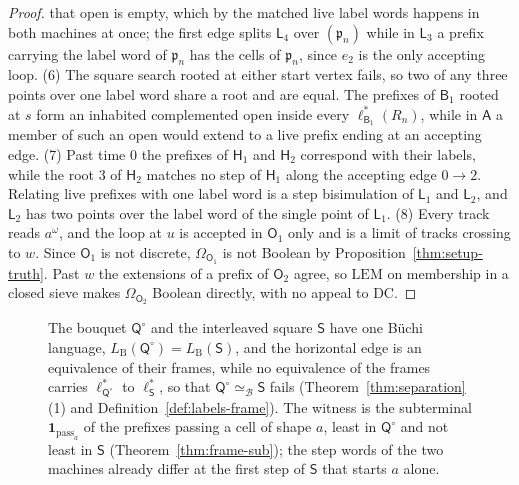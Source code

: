 \documentclass{lmcs}
\theoremstyle{definition}
\theoremstyle{remark}
\newcommand{\Op}{\mathcal{O}}
\newcommand{\prin}[1]{\mathrm{#1}}
\newcommand{\EM}{\prin{LEM}}
\newcommand{\sbt}[1]{\mathbf{1}_{#1}}
\newcommand{\LW}{\mathrm{LW}}
\providecommand{\LB}[1]{L_{\mathrm{B}}(#1)}
\providecommand{\KA}{\mathsf{A}}
\providecommand{\KB}[1]{\mathsf{B}_{#1}}
\providecommand{\wQ}{\mathsf{Q}}
\providecommand{\eqB}{\simeq_{\mathcal{B}}}
\providecommand{\lst}[1]{\ell^{*}_{#1}}
\providecommand{\DC}{\prin{DC}}
\providecommand{\wQ}{\mathsf{Q}}
\begin{document}
\begin{proof}
that open is empty, which by the matched live label words happens in both machines at once;
the first edge splits $\mathsf L_4$ over $(\mathfrak p_n)$ while in
$\mathsf L_3$ a prefix carrying the label word of $\mathfrak p_n$ has the cells of $\mathfrak p_n$, since $e_2$ is the only accepting
loop.
(6) The square search rooted at either start vertex fails, so two of any three points over one label word share a
root and are equal.
The prefixes of $\KB{1}$ rooted at $s$ form an inhabited complemented open inside every $\lst{\KB{1}}(R_n)$, while
in $\KA$ a member of such an open would extend to a live prefix ending at an accepting
edge.
(7) Past time $0$ the prefixes of $\mathsf H_1$ and $\mathsf H_2$ correspond with their
labels,
while the root $3$ of $\mathsf H_2$ matches no step of $\mathsf H_1$ along the accepting edge
$0\to2$. Relating live prefixes with one label word is a step bisimulation of
$\mathsf L_1$ and $\mathsf L_2$, and $\mathsf L_2$ has two points over the label word
of the single point of $\mathsf L_1$.
(8) Every track reads $a^\omega$, and the loop at $u$ is accepted in $\mathsf O_1$ only and is a limit of tracks
crossing to $w$.
Since $\mathsf O_1$ is not discrete, $\Omega_{\mathsf O_1}$ is not Boolean by
Proposition~\ref{thm:setup-truth}. Past $w$ the extensions of a prefix of $\mathsf O_2$ agree, so $\EM$ on membership in a closed sieve makes
$\Omega_{\mathsf O_2}$ Boolean directly, with no appeal to $\DC$.
\end{proof}

\begin{figure}[htb]
\centering
{}
\caption{The bouquet $\wQ^\circ$ and the interleaved square $\mathsf S$ have one B\"uchi language, $\LB{\wQ^\circ}=\LB{\mathsf S}$, and the horizontal edge is an
equivalence of their frames, while no equivalence of the frames carries $\lst{\wQ^\circ}$ to $\lst{\mathsf S}$, so that
$\wQ^\circ\eqB\mathsf S$ fails
(Theorem~\ref{thm:separation}(1) and Definition~\ref{def:labels-frame}). The witness is the subterminal $\sbt{\mathrm{pass}_a}$ of the prefixes passing a
cell of shape $a$, least in $\wQ^\circ$ and not least in $\mathsf S$ (Theorem~\ref{thm:frame-sub}); the step words of the two
machines already differ at the first step of $\mathsf S$ that starts $a$ alone.}
\label{fig:separation}
\end{figure}
\end{document}
